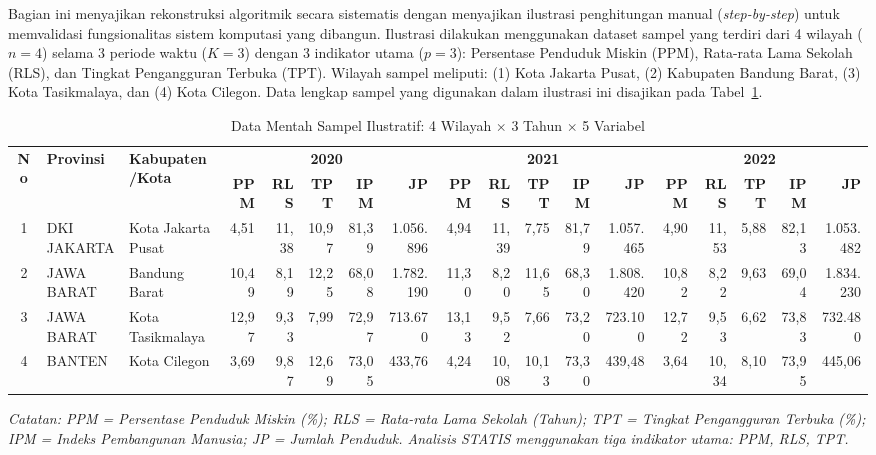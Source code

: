 Bagian ini menyajikan rekonstruksi algoritmik secara sistematis dengan menyajikan ilustrasi penghitungan manual (\textit{step-by-step}) untuk memvalidasi fungsionalitas sistem komputasi yang dibangun. Ilustrasi dilakukan menggunakan dataset sampel yang terdiri dari 4 wilayah ($n=4$) selama 3 periode waktu ($K=3$) dengan 3 indikator utama ($p=3$): Persentase Penduduk Miskin (PPM), Rata-rata Lama Sekolah (RLS), dan Tingkat Pengangguran Terbuka (TPT). Wilayah sampel meliputi: (1) Kota Jakarta Pusat, (2) Kabupaten Bandung Barat, (3) Kota Tasikmalaya, dan (4) Kota Cilegon. Data lengkap sampel yang digunakan dalam ilustrasi ini disajikan pada Tabel~\ref{tab:sample_raw_data}.

\begin{table}[H]
\centering
\caption{Data Mentah Sampel Ilustratif: 4 Wilayah $\times$ 3 Tahun $\times$ 5 Variabel}
\label{tab:sample_raw_data}
\begin{adjustbox}{max width=\textwidth}
\scriptsize
\begin{tabular}{|c|p{1.6cm}|p{2.5cm}|r|r|r|r|r|r|r|r|r|r|r|r|r|r|r|}
\hline
\multirow{2}{*}{\textbf{No}} & \multirow{2}{*}{\textbf{Provinsi}} & \multirow{2}{*}{\textbf{Kabupaten/Kota}} & \multicolumn{5}{c|}{\textbf{2020}} & \multicolumn{5}{c|}{\textbf{2021}} & \multicolumn{5}{c|}{\textbf{2022}} \\
\cline{4-18}
 & & & \textbf{PPM} & \textbf{RLS} & \textbf{TPT} & \textbf{IPM} & \textbf{JP} & \textbf{PPM} & \textbf{RLS} & \textbf{TPT} & \textbf{IPM} & \textbf{JP} & \textbf{PPM} & \textbf{RLS} & \textbf{TPT} & \textbf{IPM} & \textbf{JP} \\
\hline
1 & DKI JAKARTA & Kota Jakarta Pusat & 4,51 & 11,38 & 10,97 & 81,39 & 1.056.896 & 4,94 & 11,39 & 7,75 & 81,79 & 1.057.465 & 4,90 & 11,53 & 5,88 & 82,13 & 1.053.482 \\ \hline
2 & JAWA BARAT & Bandung Barat & 10,49 & 8,19 & 12,25 & 68,08 & 1.782.190 & 11,30 & 8,20 & 11,65 & 68,30 & 1.808.420 & 10,82 & 8,22 & 9,63 & 69,04 & 1.834.230 \\ \hline
3 & JAWA BARAT & Kota Tasikmalaya & 12,97 & 9,33 & 7,99 & 72,97 & 713.670 & 13,13 & 9,52 & 7,66 & 73,20 & 723.100 & 12,72 & 9,53 & 6,62 & 73,83 & 732.480 \\ \hline
4 & BANTEN & Kota Cilegon & 3,69 & 9,87 & 12,69 & 73,05 & 433,76 & 4,24 & 10,08 & 10,13 & 73,30 & 439,48 & 3,64 & 10,34 & 8,10 & 73,95 & 445,06 \\ \hline
\end{tabular}
\end{adjustbox}
\vspace{1mm}

\noindent\textit{\scriptsize Catatan: PPM = Persentase Penduduk Miskin (\%); RLS = Rata-rata Lama Sekolah (Tahun); TPT = Tingkat Pengangguran Terbuka (\%); IPM = Indeks Pembangunan Manusia; JP = Jumlah Penduduk. Analisis STATIS menggunakan tiga indikator utama: PPM, RLS, TPT.}
\end{table}

